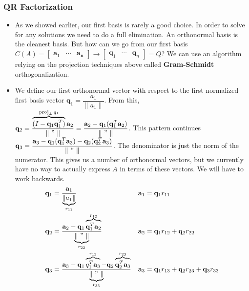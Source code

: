 \documentclass[11pt]{article}
\begin{document}
	\subsubsection{QR Factorization}
	\begin{itemize}
		\item As we showed earlier, our first basis is rarely a good choice. In order to solve for any solutions we need to do a full elimination. An orthonormal basis is the cleanest basis. But how can we go from our first basis $C(A) = \begin{bmatrix}
		  \mathbf{a_{1}} & \cdots & \mathbf{a_{n}}
		\end{bmatrix} \longrightarrow \begin{bmatrix}
		  \mathbf{q}_{1} & \cdots & \mathbf{q}_{n}
		\end{bmatrix} = Q$? We can use an algorithm relying on the projection techniques above called \textbf{Gram-Schmidt} orthogonalization.
	\item We define our first orthonormal vector with respect to the first normalized first basis vector $\mathbf{q}_{1} = \dfrac{a_{1}}{\|a_{1}\|}$. From this, $\mathbf{q}_{2} = \dfrac{\overbrace{(I - \mathbf{q}_{1} \mathbf{q}_{1}^{T})}^{\operatorname{proj}_{\perp}q_{1}}\mathbf{a}_{2}}{\| \ " \ \|} = \dfrac{\mathbf{a}_{2} - \mathbf{q}_{1}(\mathbf{q}_{1}^{T}\mathbf{a}_{2})}{\| \ " \ \|}$. This pattern continues $\mathbf{q}_{3} = \displaystyle \frac{\mathbf{a}_{3} - \mathbf{q}_{1}(\mathbf{q}_{1}^{T} \mathbf{a}_{3}) - \mathbf{q}_{2}(\mathbf{q}_{2}^{T}\mathbf{a}_{3})}{\| \ " \ \|}$.  The denominator is just the norm of the numerator. This gives us a number of orthonormal vectors, but we currently have no way to actually express $A$ in terms of these vectors. We will have to work backwards.
		\begin{align*}
			\mathbf{q}_{1} &= \frac{\mathbf{a}_{1}}{\underbrace{\|a_{1}\|}_{r_{11}}} & \mathbf{a}_{1} &= \mathbf{q}_{1}r_{11} \\
			\mathbf{q}_{2} &= \frac{\mathbf{a}_{2} - \mathbf{q}_{1} \overbrace{\mathbf{q}_{1}^{T}\mathbf{a}_{2}}^{r_{12}}}{\underbrace{\| \ " \ \|}_{r_{22}}} & \mathbf{a}_{2} &= \mathbf{q}_{1}r_{12} + \mathbf{q}_{2} r_{22} \\
			\mathbf{q}_{3} &= \frac{\mathbf{a}_{3} - \mathbf{q}_{1} \overbrace{q_{1}^{T}\mathbf{a}_{3}}^{r_{13}} - \mathbf{q}_{2} \overbrace{\mathbf{q}_{2}^{T}\mathbf{a}_{3}}^{r_{23}}}{\underbrace{\| \ " \ \|}_{r_{33}}} & \mathbf{a}_{3} &= \mathbf{q}_{1}r_{13} + \mathbf{q}_{2}r_{23} + \mathbf{q}_{3}r_{33}
		\end{align*}

\end{itemize}
\end{document}
